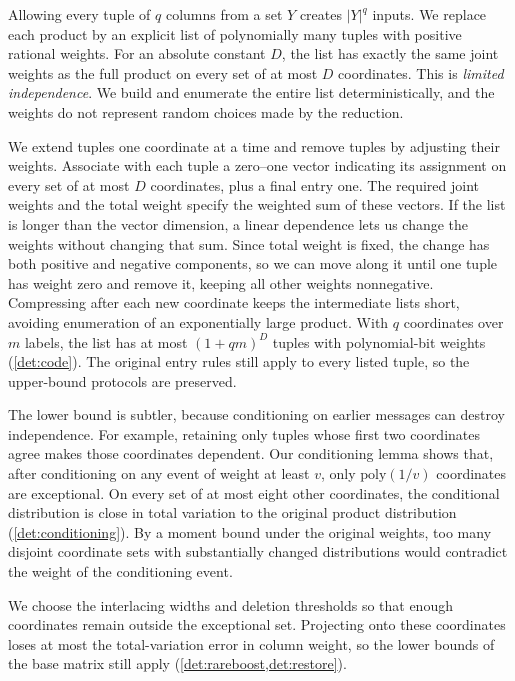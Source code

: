 \documentclass[11pt,letterpaper]{article} \usepackage[utf8]{inputenc}
\theoremstyle{plain} \newtheorem{theorem}{Theorem}[section]
\theoremstyle{definition} \newaliascnt{definition}{theorem}
\begin{document}
Allowing every tuple of $q$ columns from a set $Y$ creates $|Y|^q$ inputs.
We replace each product by an explicit list of polynomially many tuples
with positive rational weights. For an absolute constant $D$, the list
has exactly the same joint weights as the full product on every set of
at most $D$ coordinates. This is \emph{limited independence}. We build
and enumerate the entire list deterministically, and the weights do not
represent random choices made by the reduction.

We extend tuples one coordinate at a time and remove
tuples by adjusting their weights. Associate with each tuple a zero--one
vector indicating its assignment on every set of at most
$D$ coordinates, plus a final entry one.
The required joint weights and the total weight specify the weighted sum of these vectors.
If the list is longer than the vector dimension, a linear dependence
lets us change the weights without changing that sum. Since total
weight is fixed, the change has both positive and negative components,
so we can move along it until one tuple has weight zero and remove it,
keeping all other weights nonnegative. Compressing after each new coordinate
keeps the intermediate lists short, avoiding enumeration of an
exponentially large product. With $q$ coordinates over $m$ labels, the list has at most
$(1+qm)^D$ tuples with polynomial-bit weights (\cref{det:code}). The original entry rules still apply to every listed
tuple, so the upper-bound protocols are preserved.

The lower bound is subtler, because conditioning on earlier messages can
destroy independence. For example, retaining only tuples whose first two
coordinates agree makes those coordinates dependent. Our conditioning
lemma shows that, after conditioning on any event of weight at least $v$,
only $\mathrm{poly}(1/v)$ coordinates are exceptional. On every
set of at most eight other coordinates, the conditional distribution
is close in total variation to the original product distribution
(\cref{det:conditioning}). By a moment bound under the original weights,
too many disjoint coordinate sets with substantially changed distributions
would contradict the weight of the conditioning event.

We choose the interlacing widths and deletion thresholds so that enough
coordinates remain outside the exceptional set. Projecting onto these
coordinates loses at most the total-variation error in column weight,
so the lower bounds of the base matrix still apply
(\cref{det:rareboost,det:restore}).
\end{document}
